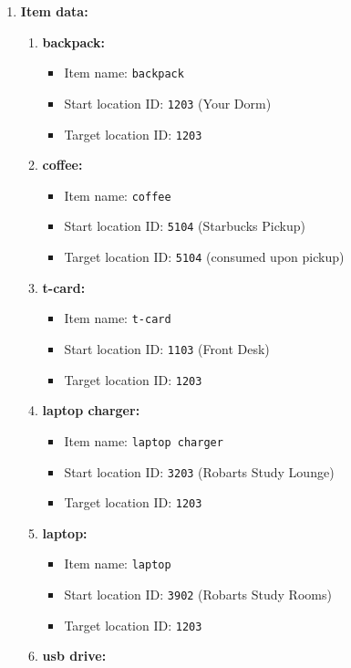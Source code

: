 \documentclass[11pt]{article}
\begin{document}
\begin{enumerate}
    \item \textbf{Item data:}
    \begin{enumerate}
        \item \textbf{backpack:}
        \begin{itemize}
            \item Item name: \texttt{backpack}
            \item Start location ID: \texttt{1203} (Your Dorm)
            \item Target location ID: \texttt{1203}
        \end{itemize}
        \item \textbf{coffee:}
        \begin{itemize}
            \item Item name: \texttt{coffee}
            \item Start location ID: \texttt{5104} (Starbucks Pickup)
            \item Target location ID: \texttt{5104} (consumed upon pickup)
        \end{itemize}
        \item \textbf{t-card:}
        \begin{itemize}
            \item Item name: \texttt{t-card}
            \item Start location ID: \texttt{1103} (Front Desk)
            \item Target location ID: \texttt{1203}
        \end{itemize}
        \item \textbf{laptop charger:}
        \begin{itemize}
            \item Item name: \texttt{laptop charger}
            \item Start location ID: \texttt{3203} (Robarts Study Lounge)
            \item Target location ID: \texttt{1203}
        \end{itemize}
        \item \textbf{laptop:}
        \begin{itemize}
            \item Item name: \texttt{laptop}
            \item Start location ID: \texttt{3902} (Robarts Study Rooms)
            \item Target location ID: \texttt{1203}
        \end{itemize}
        \item \textbf{usb drive:}

\end{enumerate}
\end{enumerate}
\end{document}
